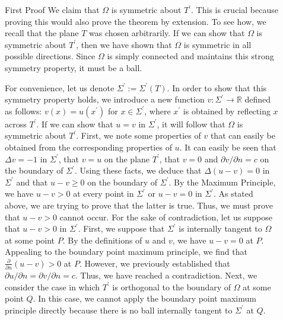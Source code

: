 \documentclass[final]{beamer}
\newlength{\sepwidth}
\newlength{\colwidth}
\newcommand{\separatorcolumn}{\begin{column}{\sepwidth}\end{column}}
\begin{document}
\begin{frame}[t]
\begin{columns}[t]
\begin{column}{\colwidth}
\begin{block}{First Proof}
    We claim that $\Omega$ is symmetric about $T^\prime$. This is crucial because proving this would also prove the theorem by extension. To see how, we recall that the plane $T$ was chosen arbitrarily. If we can show that $\Omega$ is symmetric about $T^\prime$, then we have shown that $\Omega$ is symmetric in all possible directions. Since $\Omega$ is simply connected and maintains this strong symmetry property, it must be a ball.
    
    For convenience, let us denote $\Sigma^\prime := \Sigma^\prime(T)$. In order to show that this symmetry property holds, we introduce a new function $v: \Sigma^\prime \rightarrow \mathbb{R}$ defined as follows: $v(x) = u(x^\prime)$ for $x \in \Sigma^\prime$, where $x^\prime$ is obtained by reflecting $x$ across $T^\prime$. If we can show that $u = v$ in $\Sigma^\prime$, it will follow that $\Omega$ is symmetric about $T^\prime$. First, we note some properties of $v$ that can easily be obtained from the corresponding properties of $u$. It can easily be seen that $\Delta v = -1$ in $\Sigma^\prime$, that $v = u$ on the plane $T^\prime$, that $v = 0$ and $\partial{v}/\partial{n} = c$ on the boundary of $\Sigma^\prime$. Using these facts, we deduce that $\Delta(u-v) = 0$ in $\Sigma^\prime$ and that $u-v \geq 0$ on the boundary of $\Sigma^\prime$. By the Maximum Principle, we have $u - v > 0$ at every point in $\Sigma^\prime$ or $u-v = 0$ in $\Sigma^\prime$. As stated above, we are trying to prove that the latter is true. Thus, we must prove that $u-v > 0$ cannot occur. For the sake of contradiction, let us suppose that $u - v > 0$ in $\Sigma^\prime$. First, we suppose that $\Sigma^\prime$ is internally tangent to $\Omega$ at some point $P$. By the definitions of $u$ and $v$, we have $u - v = 0$ at $P$. Appealing to the boundary point maximum principle, we find that $\frac{\partial}{\partial{n}}(u-v) > 0$ at $P$. However, we previously established that $\partial{u}/\partial{n} = \partial{v}/\partial{n} = c$. Thus, we have reached a contradiction. Next, we consider the case in which $T^\prime$ is orthogonal to the boundary of $\Omega$ at some point $Q$. In this case, we cannot apply the boundary point maximum principle directly because there is no ball internally tangent to $\Sigma^\prime$ at $Q$. 

\end{block}  
\end{column}

\separatorcolumn

\begin{column}{\colwidth}


\end{column}
\end{columns}
\end{frame}
\end{document}
